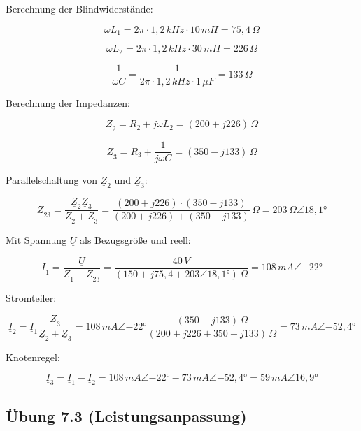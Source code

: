 \documentclass[
  ngerman,
  letterpaper,
]{scrbook}
\begin{document}
\begin{tcolorbox}[enhanced jigsaw, titlerule=0mm, rightrule=.15mm, toprule=.15mm, colback=white, toptitle=1mm, bottomrule=.15mm, coltitle=black, leftrule=.75mm, arc=.35mm, colbacktitle=quarto-callout-caution-color!10!white, opacityback=0, bottomtitle=1mm, colframe=quarto-callout-caution-color-frame, opacitybacktitle=0.6, breakable, title=\textcolor{quarto-callout-caution-color}{\faFire}\hspace{0.5em}{Lösung 7.2}, left=2mm]

Berechnung der Blindwiderstände:

\[\omega L_1 = 2\pi \cdot 1,2\,kHz \cdot 10\,mH = 75,4\,\Omega\]

\[\omega L_2 = 2\pi \cdot 1,2\,kHz \cdot 30\,mH = 226\,\Omega\]

\[\frac{1}{\omega C} = \frac{1}{2\pi \cdot 1,2\,kHz \cdot 1\,\mu F} = 133\,\Omega\]

Berechnung der Impedanzen:

\[\underline{Z}_2 = R_2 + j\omega L_2 = (200 + j226)\,\Omega\]

\[\underline{Z}_3 = R_3 + \frac{1}{j \omega C} = (350 - j133)\,\Omega\]

Parallelschaltung von \(\underline{Z}_2\) und \(\underline{Z}_3\):

\[\underline{Z}_{23} = \frac{\underline{Z}_2 \underline{Z}_3}{\underline{Z}_2 + \underline{Z}_3} = \frac{(200 + j226)\cdot (350 - j133)}{(200 + j 226) + (350 - j133)}\,\Omega = 203\,\Omega \angle{18,1°}\]

Mit Spannung \(\underline{U}\) als Bezugsgröße und reell:

\[\underline{I}_1 = \frac{\underline{U}}{\underline{Z}_1 + \underline{Z}_{23}} = \frac{40\,V}{(150 + j75,4 + 203 \angle{18,1°})\,\Omega} = 108\,mA \angle{-22°}\]

Stromteiler:

\[\underline{I}_2 = \underline{I}_1 \frac{\underline{Z}_3}{\underline{Z}_2 + \underline{Z}_3} = 108\,mA \angle{-22°} \frac{(350 - j133)\,\Omega}{(200 + j226 + 350 - j133)\,\Omega} = 73\,mA\angle{-52,4°}\]

Knotenregel:

\[\underline{I}_3 = \underline{I}_1 - \underline{I}_2 = 108\,mA\angle{-22°} - 73\,mA\angle{-52,4°} = 59\,mA\angle{16,9°}\]

\end{tcolorbox}

\subsection{Übung 7.3
(Leistungsanpassung)}\label{uxfcbung-7.3-leistungsanpassung}
\end{document}
